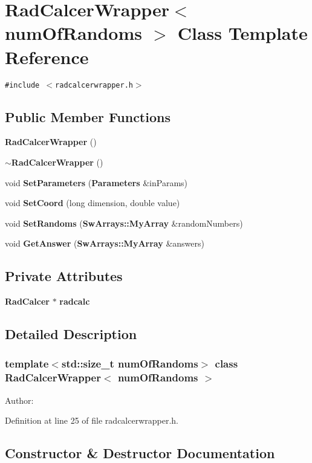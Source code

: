 \section{RadCalcerWrapper$<$ numOfRandoms $>$ Class Template Reference}
\label{classRadCalcerWrapper}
{\tt \#include $<$radcalcerwrapper.h$>$}

\subsection*{Public Member Functions}
\begin{CompactItemize}
\item 
{\bf RadCalcerWrapper} ()
\item 
{\bf $\sim$RadCalcerWrapper} ()
\item 
void {\bf SetParameters} ({\bf Parameters} \&inParams)
\item 
void {\bf SetCoord} (long dimension, double value)
\item 
void {\bf SetRandoms} ({\bf SwArrays::MyArray} \&randomNumbers)
\item 
void {\bf GetAnswer} ({\bf SwArrays::MyArray} \&answers)
\end{CompactItemize}
\subsection*{Private Attributes}
\begin{CompactItemize}
\item 
{\bf RadCalcer} $\ast$ {\bf radcalc}
\end{CompactItemize}


\subsection{Detailed Description}
\subsubsection*{template$<$std::size\_\-t numOfRandoms$>$ class RadCalcerWrapper$<$ numOfRandoms $>$}

\begin{Desc}
\item[Author:]\end{Desc}


Definition at line 25 of file radcalcerwrapper.h.

\subsection{Constructor \& Destructor Documentation}
